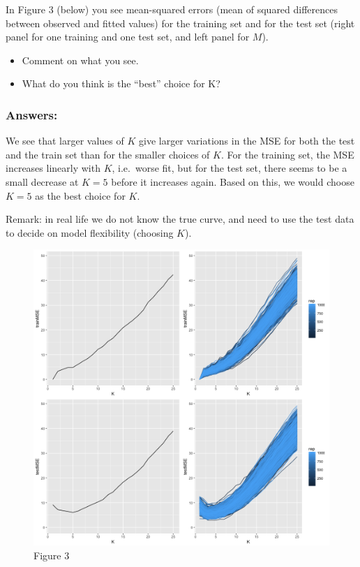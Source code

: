 \documentclass[]{article}
\providecommand{\tightlist}{%
  \setlength{\itemsep}{0pt}\setlength{\parskip}{0pt}}
\begin{document}
In Figure 3 (below) you see mean-squared errors (mean of squared
differences between observed and fitted values) for the training set and
for the test set (right panel for one training and one test set, and
left panel for \(M\)).

\begin{itemize}
\tightlist
\item
  Comment on what you see.
\item
  What do you think is the ``best'' choice for K?
\end{itemize}

\subsubsection{Answers:}\label{answers-1}

{ We see that larger values of \(K\) give larger variations in the MSE
for both the test and the train set than for the smaller choices of
\(K\). For the training set, the MSE increases linearly with \(K\),
i.e.~worse fit, but for the test set, there seems to be a small decrease
at \(K=5\) before it increases again. Based on this, we would choose
\(K=5\) as the best choice for \(K\). }

Remark: in real life we do not know the true curve, and need to use the
test data to decide on model flexibility (choosing \(K\)).

\begin{figure}
\centering
\includegraphics{Prob1f3.png}
\caption{Figure 3}
\end{figure}
\end{document}
